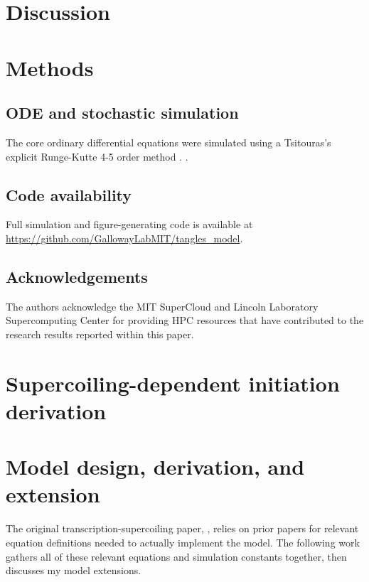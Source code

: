 \documentclass[11pt]{article}
\begin{document}
\FloatBarrier
\section{Discussion}

\section{Methods}
\subsection{ODE and stochastic simulation}
The core ordinary differential equations were simulated using a Tsitouras's explicit Runge-Kutte 4-5 order method \parencite{tsitourasRungeKuttaPairs2011}.
\parencite{rackauckasDifferentialEquationsJlPerformant2017}.

\subsection{Code availability}
Full simulation and figure-generating code is available at \url{https://github.com/GallowayLabMIT/tangles_model}.

\subsection{Acknowledgements}
The authors acknowledge the MIT SuperCloud and Lincoln Laboratory Supercomputing Center \parencite{reutherInteractiveSupercomputing402018} for providing HPC resources that have contributed to the research results reported within this paper.

\printbibliography

\clearpage
\appendix
\renewcommand{\appendixpagename}{Supplemental information}
\renewcommand{\thefigure}{S\arabic{figure}}
\setcounter{figure}{0}
\appendixpage
\section{Supercoiling-dependent initiation derivation} \label{sec:sc_initation_derivation}


\section{Model design, derivation, and extension}
\label{sec:appendix:model}
The original transcription-supercoiling paper, \cite{sevierPropertiesGeneExpression2018}, relies on prior papers for relevant equation definitions needed to actually implement the model. The following work gathers all of these relevant equations and simulation constants together, then discusses my model extensions.
\end{document}
